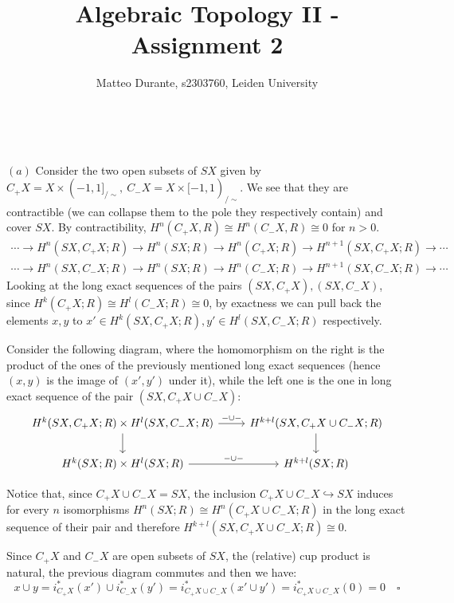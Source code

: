 \documentclass{article}
\newcommand{\exercise}[1]{\noindent {\bf Exercise #1}}
\begin{document}
\title{Algebraic Topology II - Assignment 2}

\author{Matteo Durante, s2303760, Leiden University}

\maketitle


~\\
\exercise{4}

\proof $(a)$ Consider the two open subsets of $SX$ given by $C_+X=X\times
(-1,1]_{/\sim},\ C_-X=X\times [-1,1)_{/\sim}$. We see that they are
contractible (we can collapse them to the pole they respectively contain) and
cover $SX$. By contractibility, $H^n(C_+X,R)\cong H^n(C_-X,R)
\cong 0$ for $n>0$.
\begin{align*}
    \cdots\rightarrow H^n(SX,C_+X;R)\rightarrow H^n(SX;R)\rightarrow
    H^n(C_+X;R)\rightarrow H^{n+1}(SX,C_+X;R)\rightarrow\cdots \\
    \cdots\rightarrow H^n(SX,C_-X;R)\rightarrow H^n(SX;R)\rightarrow
    H^n(C_-X;R)\rightarrow H^{n+1}(SX,C_-X;R)\rightarrow\cdots
\end{align*}
Looking at the long exact sequences of the pairs $(SX,C_+X),(SX,C_-X)$, since
$H^k(C_+X;R)\cong H^l(C_-X;R)\cong 0$, by exactness we can pull back the
elements $x,y$ to $x'\in H^k(SX,C_+X;R),y'\in H^l(SX,C_-X;R)$ respectively.

Consider the following diagram, where the homomorphism on the right is the
product of the ones of the previously mentioned long exact sequences (hence
$(x,y)$ is the image of $(x',y')$ under it), while the left one is the one in
long exact sequence of the pair $(SX,C_+X\cup C_-X)$:
\[
    \begin{tikzcd}
        H^k(SX,C_+X;R)\times H^l(SX,C_-X;R)\arrow{r}{-\cup -}\arrow{d}
        & H^{k+l}(SX,C_+X\cup C_-X;R)\arrow{d} \\
        H^k(SX;R)\times H^l(SX;R)\arrow{r}{-\cup -}
        & H^{k+l}(SX;R)
    \end{tikzcd}
\]

Notice that, since $C_+X\cup C_-X=SX$, the inclusion $C_+X\cup
C_-X\hookrightarrow SX$ induces for every $n$ isomorphisms $H^n(SX;R)\cong
H^n(C_+X\cup C_-X;R)$ in the long exact sequence of their
pair and therefore $H^{k+l}(SX,C_+X\cup C_-X;R)\cong 0$.

Since $C_+X$ and $C_-X$ are open subsets of $SX$, the (relative) cup product is
natural, the previous diagram commutes and then we have:
$$x\cup y=i^*_{C_+X}(x')\cup i^*_{C_-X}(y')=i^*_{C_+X\cup C_-X}(x'\cup y')=
i^*_{C_+X\cup C_-X}(0)=0\quad\square$$
\end{document}
